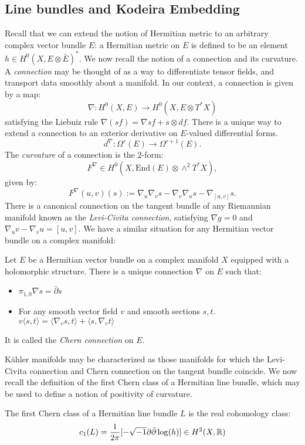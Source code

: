 \subsection{Line bundles and Kodeira Embedding}
Recall that we can extend the notion of Hermitian metric to an arbitrary complex vector bundle \(E\): a Hermitian metric on \(E\) is defined to be an element \(h \in H^0(X, E \otimes \bar{E})^* \). We now recall the notion of a connection and its curvature. A \textit{connection} may be thought of as a way to differentiate tensor fields, and transport data smoothly about a manifold. In our context,  a connection is given by a map:
\[
\nabla: H^0(X,E) \to H^0(X,E \otimes T^* X)
\]
satisfying the Liebniz rule \(\nabla(s f) = \nabla s f + s \otimes df\). There is a unique way to extend a connection to an exterior derivative on \(E\)-valued differential forms.
\[
d^\nabla: \Omega^r(E) \to \Omega^{r+1}(E).
\]
The \textit{curvature} of a connection is the \(2\)-form:
\[
F^\nabla \in H^0(X, \text{End}(E) \otimes \wedge^2 T^* X),
\]
given by:
\[
F^\nabla(u,v)(s) := \nabla_u \nabla_v s - \nabla_v \nabla_u s - \nabla_{[u,v]} s.
\]
There is a canonical connection on the tangent bundle of any Riemannian manifold known as the \textit{Levi-Civita connection}, satisfying \(\nabla g = 0\) and \(\nabla_u v - \nabla_v u = [u,v]\). We have a similar situation for any Hermitian vector bundle on a complex manifold:	
\begin{example}
Let \(E\) be a Hermitian vector bundle on a complex manifold \(X\) equipped with a holomorphic structure. There is a unique connection \(\nabla\) on \(E\) such that:
\begin{itemize}
\item  \(\pi_{1,0} \nabla s = \bar{\partial} s\)
\item For any smooth vector field \(v\) and smooth sections \(s,t\). \(v \langle s,t \rangle = \langle \nabla_v s , t \rangle + \langle s, \nabla_v t \rangle\) 
\end{itemize}
It is called the \textit{Chern connection} on \(E\).
\end{example}
K\"ahler manifolds may be characterized as those manifolds for which the Levi-Civita connection and Chern connection on the tangent bundle coincide. We now recall the definition of the first Chern class of a Hermitian line bundle, which may be used to define a notion of positivity of curvature. 
\begin{definition}
The first Chern class of a Hermitian line bundle \(L\) is the real cohomology class:
\[
c_1(L) = \frac{1}{2 \pi} [  - \sqrt{-1} \partial \bar{\partial} \log(h) ] \in H^2(X, \mathbb{R})
\]
\end{definition}
